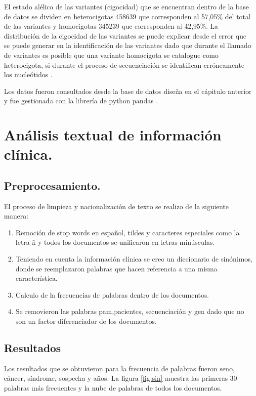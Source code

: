 El estado alélico de las variantes (cigocidad) que se encuentran dentro de la base de datos se dividen en heterocigotas 458639 que corresponden al 57,05\% del total de las variantes  y homocigotas 345239 que corresponden al 42,95\%. La distribución de la cigocidad de las variantes se puede explicar desde el error que se puede generar en la identificación de las variantes dado que durante el llamado  de variantes es posible que una variante homocigota se catalogue como heterocigota, si durante el proceso de secuenciación se identifican erróneamente los nucleótidos \cite{Babraham2016}\cite{Pirooznia2014}. 

Los datos fueron consultados desde la base de datos diseña en el cápitulo anterior y fue gestionada con la librería de python pandas \cite{mckinneypandas}.


\section{Análisis textual de información clínica.}

 
\subsection{Preprocesamiento.}

El proceso de limpieza y nacionalización de texto se realizo de la siguiente manera:

 \begin{enumerate}
 	\item Remoción de stop words en español, tildes y caracteres especiales como  la letra ñ y todos los documentos se unificaron en letras minúsculas.
 	\item Teniendo en cuenta la información clínica se creo un diccionario de sinónimos, donde se reemplazaron palabras que hacen referencia a una misma característica.
 	\item Calculo de la frecuencias de palabras dentro de los documentos. 
 	\item Se removieron las palabras pam,pacientes, secuenciación y gen dado que no son un factor diferenciador de los documentos.  	  
 \end{enumerate}

\subsection*{Resultados}

Los resultados que se obtuvieron para la frecuencia de palabras fueron seno, cáncer, síndrome, sospecha y años. La figura \ref{fig:sin} muestra las primeras 30 palabras más frecuentes y la nube de palabras de todos los documentos.\\

